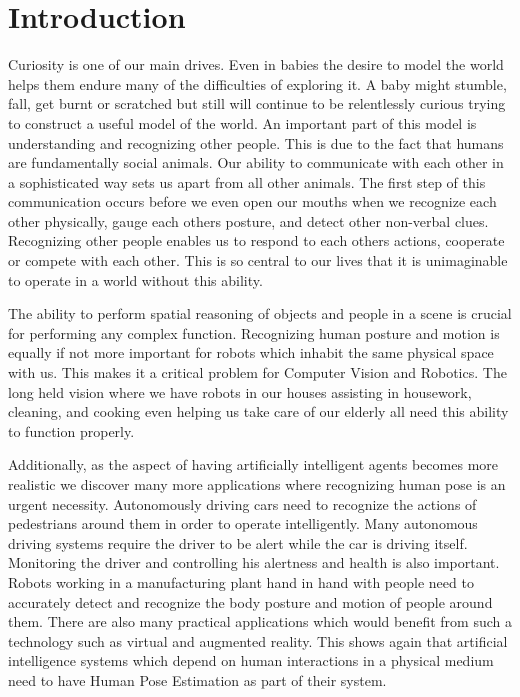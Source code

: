 

\chapter{Introduction}\label{chapter:introduction}

Curiosity is one of our main drives. Even in babies the desire to model the world helps them endure many of the difficulties of exploring it. A baby might stumble, fall, get burnt or scratched but still will continue to be relentlessly curious trying to construct a useful model of the world. An important part of this model is understanding and recognizing other people. This is due to the fact that humans are fundamentally social animals. Our ability to communicate with each other in a sophisticated way sets us apart from all other animals. The first step of this communication occurs before we even open our mouths when we recognize each other physically, gauge each others posture, and detect other non-verbal clues. Recognizing other people enables us to respond to each others actions, cooperate or compete with each other. This is so central to our lives that it is unimaginable to operate in a world without this ability. 

The ability to perform spatial reasoning of objects and people in a scene is crucial for performing any complex function. Recognizing human posture and motion is equally if not more important for robots which inhabit the same physical space with us. This makes it a critical problem for Computer Vision and Robotics. The long held vision where we have robots in our houses assisting in housework, cleaning, and cooking even helping us take care of our elderly all need this ability to function properly.

Additionally, as the aspect of having artificially intelligent agents becomes more realistic we discover many more applications where recognizing human pose is an urgent necessity. Autonomously driving cars need to recognize the actions of pedestrians around them in order to operate intelligently. Many autonomous driving systems require the driver to be alert while the car is driving itself. Monitoring the driver and controlling his alertness and health is also important. Robots working in a manufacturing plant hand in hand with people need to accurately detect and recognize the body posture and motion of people around them. There are also many practical applications which would benefit from such a technology such as virtual and augmented reality. This shows again that artificial intelligence systems which depend on human interactions in a physical medium need to have Human Pose Estimation as part of their system.

